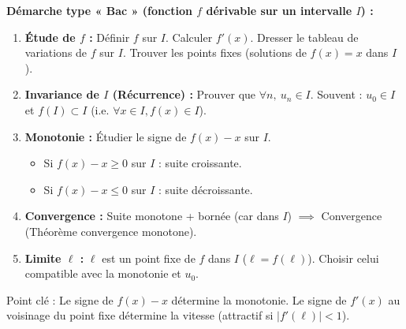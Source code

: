 \documentclass[11pt]{article}
\newcommand{\cle}[1]{{\popxbold\color{popdark}#1}}
\begin{document}
\begin{methode}[Étudier une suite $u_{n+1} = f(u_n)$ : variation, convergence, limite]
\textbf{Démarche type « Bac » (fonction $f$ dérivable sur un intervalle $I$) :}
\begin{enumerate}
    \item \textbf{Étude de $f$ :} Définir $f$ sur $I$. Calculer $f'(x)$. Dresser le tableau de variations de $f$ sur $I$. Trouver les points fixes (solutions de $f(x)=x$ dans $I$).
    \item \textbf{Invariance de $I$ (Récurrence) :} Prouver que $\forall n,\ u_n \in I$.
        Souvent : $u_0 \in I$ et $f(I) \subset I$ (i.e. $\forall x \in I, f(x) \in I$).
    \item \textbf{Monotonie :} Étudier le signe de $f(x)-x$ sur $I$.
        \begin{itemize}
            \item Si $f(x)-x \ge 0$ sur $I$ : suite croissante.
            \item Si $f(x)-x \le 0$ sur $I$ : suite décroissante.
        \end{itemize}
    \item \textbf{Convergence :} Suite monotone + bornée (car dans $I$) $\implies$ Convergence (Théorème convergence monotone).
    \item \textbf{Limite $\ell$ :} $\ell$ est un point fixe de $f$ dans $I$ ($\ell = f(\ell)$). Choisir celui compatible avec la monotonie et $u_0$.
\end{enumerate}
\cle{Point clé :} Le signe de $f(x)-x$ détermine la monotonie. Le signe de $f'(x)$ au voisinage du point fixe détermine la vitesse (attractif si $|f'(\ell)|<1$).
\end{methode}
\end{document}
